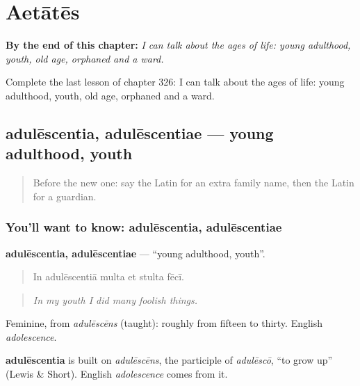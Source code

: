 
\chapter{Aetātēs}
\label{ch:la-aetates}

\begin{chapteropening}
\textbf{By the end of this chapter:} \emph{I can talk about the ages of life: young adulthood, youth, old age, orphaned and a ward.}

Complete the last lesson of chapter 326: I can talk about the ages of life: young adulthood, youth, old age, orphaned and a ward.
\end{chapteropening}

\section[adulēscentia, adulēscentiae]{adulēscentia, adulēscentiae — young adulthood, youth}

\label{lesson:LA-C326-adulescentia}



\begin{quote}
Before the new one: say the Latin for an extra family name, then the Latin for a guardian.
\end{quote}

\subsection*{You'll want to know: adulēscentia, adulēscentiae}
\textbf{adulēscentia, adulēscentiae} — \textquotedblleft{}young adulthood, youth\textquotedblright{}.

\begin{quote}
In adulēscentiā multa et stulta fēcī.
\end{quote}

\begin{quote}
\emph{In my youth I did many foolish things.}
\end{quote}

Feminine, from \emph{adulēscēns} (taught): roughly from fifteen to thirty. English \emph{adolescence}.

\begin{cousinweb}
\textbf{adulēscentia} is built on \emph{adulēscēns}, the participle of \emph{adulēscō}, \textquotedblleft{}to grow up\textquotedblright{} (Lewis \& Short). English \emph{adolescence} comes from it.
\end{cousinweb}

